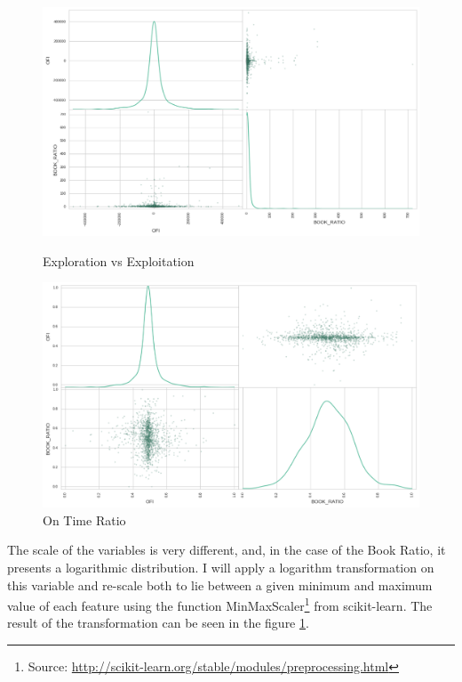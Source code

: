 \documentclass[a4paper]{article}
\begin{document}
\begin{figure}[ht!]
  \includegraphics[width=\linewidth]{figures/scatter_feat_1.png}
  \caption{\label{fig:features_one}Exploration vs Exploitation}
\endminipage
{}
  \includegraphics[width=\linewidth]{figures/scatter_feat_2.png}
  \caption{\label{fig:features_two}On Time Ratio}
\endminipage
\end{figure}

The scale of the variables is very different, and, in the case of the Book Ratio, it presents a logarithmic distribution. I will apply a logarithm transformation on this variable and re-scale both to lie between a given minimum and maximum value of each feature using the function MinMaxScaler\footnote{Source: \url{http://scikit-learn.org/stable/modules/preprocessing.html}} from scikit-learn. The result of the transformation can be seen in the figure \ref{fig:features_two}.
\end{document}
